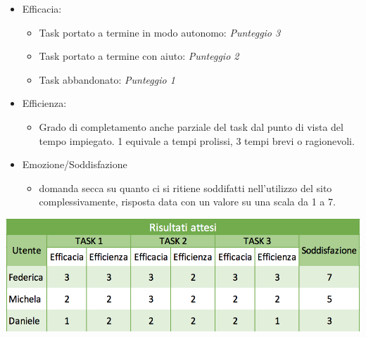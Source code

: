 \documentclass[12pt,a4paper]{report}
\begin{document}
  \begin{itemize}
  \item Efficacia:
    \begin{itemize}
    \item Task portato a termine in modo autonomo: \textit{Punteggio 3}
    \item Task portato a termine con aiuto: \textit{Punteggio 2}
    \item Task abbandonato: \textit{Punteggio 1}
    \end{itemize}
  \item Efficienza:
    \begin{itemize}
    \item Grado di completamento anche parziale del task dal punto di vista del tempo impiegato. 1 equivale a tempi prolissi, 3 tempi brevi o ragionevoli.
    \end{itemize}
  \item Emozione/Soddisfazione
    \begin{itemize}
    \item domanda secca su quanto ci si ritiene soddifatti nell'utilizzo del sito complessivamente, risposta data con un valore su una scala da 1 a 7.
    \end{itemize}
  \end{itemize}
  \includegraphics[width=1\textwidth]{"Project Management Sources/RisultatiAttesi"}
\end{document}
